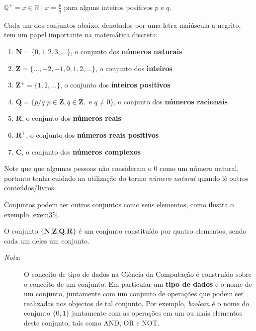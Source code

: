 \begin{center}$\mathbb{Q}^{+} = x \in \mathbb{R} \mid x = \frac{p}{q}$ para alguns
inteiros positivos $p$ e $q$.\end{center}

Cada um dos conjuntos abaixo, denotados por uma letra maiúscula a negrito, tem
um papel importante na matemática discreta:

\begin{enumerate}
  \item  $\textbf{N} = \{0,1,2,3,\ldots\}$, o conjunto dos \textbf{números
  naturais}
  \item $\textbf{Z} = \{\ldots,-2,-1,0,1,2,\ldots\}$, o conjunto dos
  \textbf{inteiros}
  \item $\textbf{Z}^+ = \{1,2,\ldots\}$, o conjunto dos \textbf{inteiros
  positivos}
  \item $\textbf{Q} = \{p/q$ \mid $p \in \textbf{Z}, q \in \textbf{Z},$ e $ q
  \neq 0\}$, o conjunto dos \textbf{números racionais}
  \item $\textbf{R}$, o conjunto dos \textbf{números reais}
  \item $\textbf{R}^+$, o conjunto dos \textbf{números reais positivos}
  \item $\textbf{C}$, o conjunto dos \textbf{números complexos}
\end{enumerate}

Note que que algumas pessoas não consideram o $0$ como um número natural,
portanto tenha cuidado na utilização do termo \emph{número natural} quando lê
outros conteúdos/livros.

Conjuntos podem ter outros conjuntos como seus elementos, como ilustra o exemplo
\ref{exem35}.


\begin{exmp}
\label{exem35}
O conjunto $\{\textbf{N,Z,Q,R}\}$ é um conjunto constituído por quatro
elementos, sendo cada um deles um conjunto.
\end{exmp}

\begin{description}
\item[\emph{Nota}:] O conceito de tipo de dados na Ciência da Computação é
construído sobre o conceito de um conjunto. Em particular um \textbf{tipo de
dados} é o nome de um conjunto, juntamente com um conjunto de operações que
podem ser realizadas nos objectos de tal conjunto. Por exemplo, \emph{boolean} é
o nome do conjunto $\{0,1\}$ juntamente com as operações em um ou mais elementos
deste conjunto, tais como AND, OR e NOT.
\end{description}


